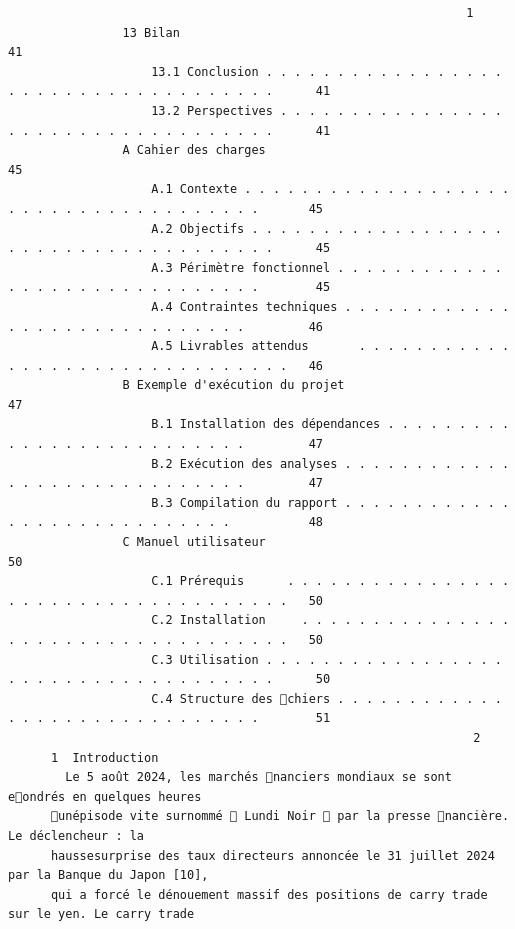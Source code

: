\documentclass[12pt]{article}
\begin{document}
\begin{verbatim}
                                                                1
                13 Bilan                                                                                        41
                    13.1 Conclusion . . . . . . . . . . . . . . . . . . . . . . . . . . . . . . . . . . . .      41
                    13.2 Perspectives . . . . . . . . . . . . . . . . . . . . . . . . . . . . . . . . . . .      41
                A Cahier des charges                                                                            45
                    A.1 Contexte . . . . . . . . . . . . . . . . . . . . . . . . . . . . . . . . . . . . .       45
                    A.2 Objectifs . . . . . . . . . . . . . . . . . . . . . . . . . . . . . . . . . . . . .      45
                    A.3 Périmètre fonctionnel . . . . . . . . . . . . . . . . . . . . . . . . . . . . . .        45
                    A.4 Contraintes techniques . . . . . . . . . . . . . . . . . . . . . . . . . . . . .         46
                    A.5 Livrables attendus       . . . . . . . . . . . . . . . . . . . . . . . . . . . . . . .   46
                B Exemple d'exécution du projet                                                                 47
                    B.1 Installation des dépendances . . . . . . . . . . . . . . . . . . . . . . . . . .         47
                    B.2 Exécution des analyses . . . . . . . . . . . . . . . . . . . . . . . . . . . . .         47
                    B.3 Compilation du rapport . . . . . . . . . . . . . . . . . . . . . . . . . . . .           48
                C Manuel utilisateur                                                                            50
                    C.1 Prérequis      . . . . . . . . . . . . . . . . . . . . . . . . . . . . . . . . . . . .   50
                    C.2 Installation     . . . . . . . . . . . . . . . . . . . . . . . . . . . . . . . . . . .   50
                    C.3 Utilisation . . . . . . . . . . . . . . . . . . . . . . . . . . . . . . . . . . . .      50
                    C.4 Structure des chiers . . . . . . . . . . . . . . . . . . . . . . . . . . . . . .        51
                                                                 2
      1  Introduction
        Le 5 août 2024, les marchés nanciers mondiaux se sont eondrés en quelques heures
      unépisode vite surnommé  Lundi Noir  par la presse nancière. Le déclencheur : la
      haussesurprise des taux directeurs annoncée le 31 juillet 2024 par la Banque du Japon [10],
      qui a forcé le dénouement massif des positions de carry trade sur le yen. Le carry trade

\end{verbatim}
\end{document}
